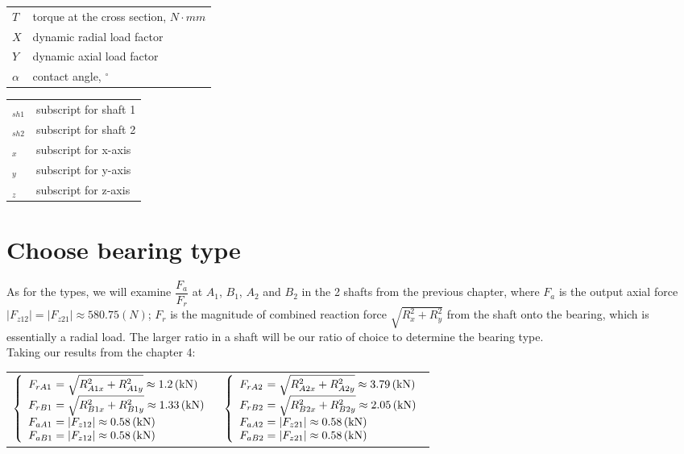 \begin{tabular}[t]{lp{6.5cm}}
	$ T $ & torque at the cross section, $ \unit{N\cdot mm} $\\
	$ X $ & dynamic radial load factor\\
	$ Y $ & dynamic axial load factor\\
	$ \alpha $ & contact angle, $ ^\circ $\\
	
\end{tabular}
\begin{tabular}[t]{lp{6.5cm}}
	$ _{sh1} $ & subscript for shaft 1\\
	$ _{sh2} $ & subscript for shaft 2\\
	$ _x $ & subscript for x-axis\\
	$ _y $ & subscript for y-axis\\
	$ _z $ & subscript for z-axis\\
\end{tabular}

\section{Choose bearing type}
As for the types, we will examine $  \dfrac{F_a}{F_r}  $ at $ A_1 $, $ B_1 $, $ A_2 $ and $ B_2 $ in the 2 shafts from the previous chapter, where $ F_a $ is the output axial force $ |F_{z12}| = |F_{z21}| \approx 580.75 \unit{(N)} $; $ F_r $ is the magnitude of combined reaction force $ \sqrt{R_x^2+R_y^2} $ from the shaft onto the bearing, which is essentially a radial load. The larger ratio in a shaft will be our ratio of choice to determine the bearing type.\\
Taking our results from the chapter 4: \vskip2mm
{\centering
	\begin{tabular}[ht]{p{7.5cm}p{7.5cm}}
		$
		\left\{ 
		\begin{array}{l@{{} = {}}l}
		F_{rA1} & \sqrt{R_{A1x}^2+R_{A1y}^2}  \approx  1.2\unit{(kN)}\\
		F_{rB1} & \sqrt{R_{B1x}^2+R_{B1y}^2}  \approx  1.33\unit{(kN)}\\
		F_{aA1} & |F_{z12}|  \approx  0.58 \unit{(kN)}\\
		F_{aB1} & |F_{z12}|  \approx  0.58 \unit{(kN)}\\
		\end{array}
		\right.
		$ & $
		\left\{ 
		\begin{array}{l@{{} = {}}l}
		F_{rA2} & \sqrt{R_{A2x}^2+R_{A2y}^2}  \approx  3.79\unit{(kN)}\\
		F_{rB2} & \sqrt{R_{B2x}^2+R_{B2y}^2}  \approx  2.05\unit{(kN)}\\
		F_{aA2} & |F_{z21}|  \approx  0.58 \unit{(kN)}\\
		F_{aB2} & |F_{z21}|  \approx  0.58 \unit{(kN)}\\
		\end{array}
		\right.
		$
\end{tabular}}\vskip2mm


